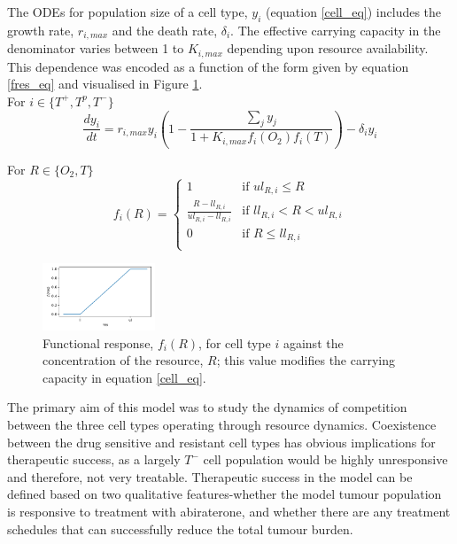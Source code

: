 \documentclass[12pt,onecolumn,twoside]{article}
\begin{document}
	The ODEs for population size of a cell type, $y_i$ (equation \ref{cell_eq}) includes the growth rate, $r_{i,max}$ and the death rate, $\delta_i$. The effective carrying capacity in the denominator varies between 1 to $K_{i,max}$ depending upon resource availability. This dependence was encoded as a function of the form given by equation \ref{fres_eq} and visualised in Figure \ref{fig_fres}.\\
	For $i \in \{T^+,T^p,T^-\}$
	\begin{equation}
	  \frac{dy_i}{dt} = r_{i,max} y_i (1 - \frac{\sum_j y_j}{1 + K_{i,max} f_i(O_2) f_i(T)} )- \delta_i y_i
	  \label{cell_eq}
	\end{equation}

	For $R \in \{O_2,T\}$
	\begin{equation}
	  f_i(R) = \begin{cases}
	  1 &\text{if } ul_{R,i} \leq R \\
	  \frac{R-ll_{R,i}}{ul_{R,i}-ll_{R,i}} &\text{if } ll_{R,i} < R < ul_{R,i} \\
	  0 &\text{if } R \leq ll_{R,i} \\
	  \end{cases}
	  \label{fres_eq}
	\end{equation}

	\begin{figure}
		\centering
		\includegraphics[width=0.3\textwidth]{f_res}
	\caption{\small Functional response, $f_i(R)$, for cell type $i$ against the concentration of the resource, $R$; this value modifies the carrying capacity in equation \ref{cell_eq}.}
	\label{fig_fres}
	\end{figure}

	The primary aim of this model was to study the dynamics of competition between the three cell types operating through resource dynamics. Coexistence between the drug sensitive and resistant cell types has obvious implications for therapeutic success, as a largely $T^-$ cell population would be highly unresponsive and therefore, not very treatable. Therapeutic success in the model can be defined based on two qualitative features-whether the model tumour population is responsive to treatment with abiraterone, and whether there are any treatment schedules that can successfully reduce the total tumour burden.
\end{document}
